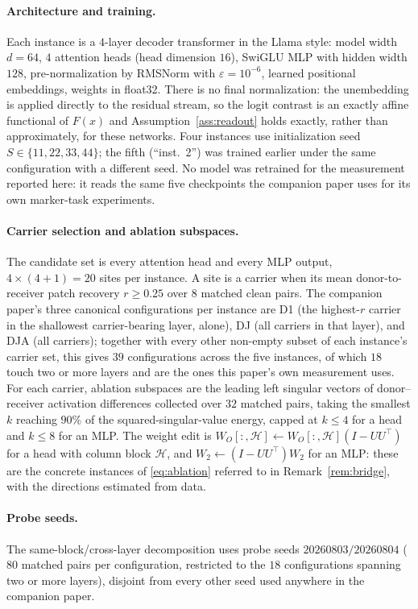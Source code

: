 \documentclass[11pt,a4paper]{article}
\begin{document}
\paragraph{Architecture and training.} Each instance is a $4$-layer decoder
transformer in the Llama style: model width $d=64$, $4$ attention heads
(head dimension $16$), SwiGLU MLP with hidden width $128$, pre-normalization
by RMSNorm with $\varepsilon=10^{-6}$, learned positional embeddings, weights
in float32. There is no final normalization: the unembedding is applied
directly to the residual stream, so the logit contrast is an exactly affine
functional of $F(x)$ and Assumption~\ref{ass:readout} holds exactly, rather
than approximately, for these networks. Four instances use initialization
seed $S\in\{11,22,33,44\}$; the fifth (``inst.\ 2'') was trained earlier
under the same configuration with a different seed. No model was retrained
for the measurement reported here: it reads the same five checkpoints the
companion paper uses for its own marker-task experiments.

\paragraph{Carrier selection and ablation subspaces.} The candidate set is
every attention head and every MLP output, $4\times(4+1)=20$ sites per
instance. A site is a carrier when its mean donor-to-receiver patch recovery
$r\ge0.25$ over $8$ matched clean pairs. The companion paper's three
canonical configurations per instance are D1 (the highest-$r$ carrier in the
shallowest carrier-bearing layer, alone), DJ (all carriers in that layer),
and DJA (all carriers); together with every other non-empty subset of each
instance's carrier set, this gives $39$ configurations across the five
instances, of which $18$ touch two or more layers and are the ones this
paper's own measurement uses. For each carrier, ablation subspaces are the
leading left singular vectors of donor--receiver activation differences
collected over $32$ matched pairs, taking the smallest $k$ reaching $90\%$ of
the squared-singular-value energy, capped at $k\le4$ for a head and $k\le8$
for an MLP. The weight edit is
$W_O[:,\mathcal H]\leftarrow W_O[:,\mathcal H](I-UU^\top)$ for a head with
column block $\mathcal H$, and $W_2\leftarrow(I-UU^\top)W_2$ for an MLP:
these are the concrete instances of \eqref{eq:ablation} referred to in
Remark~\ref{rem:bridge}, with the directions estimated from data.

\paragraph{Probe seeds.} The same-block/cross-layer decomposition uses probe
seeds $20260803/20260804$ ($80$ matched pairs per configuration, restricted
to the $18$ configurations spanning two or more layers), disjoint from every
other seed used anywhere in the companion paper.
\end{document}
